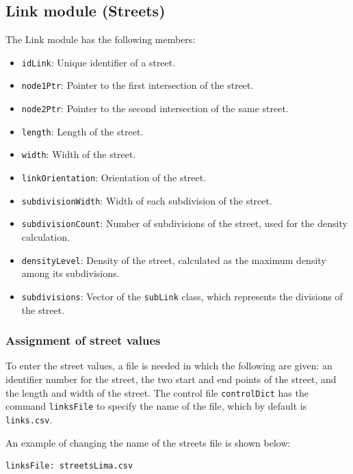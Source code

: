 \documentclass[12pt,a4paper]{book}
\begin{document}
\subsection{Link module (Streets)}
The Link module has the following members:
\begin{itemize}
  \item \texttt{idLink}: Unique identifier of a street.
  \item \texttt{node1Ptr}: Pointer to the first intersection of the street.
  \item \texttt{node2Ptr}: Pointer to the second intersection of the same street.
  \item \texttt{length}: Length of the street.
  \item \texttt{width}: Width of the street.
  \item \texttt{linkOrientation}: Orientation of the street.
  \item \texttt{subdivisionWidth}: Width of each subdivision of the street.
  \item \texttt{subdivisionCount}: Number of subdivisions of the street, used for the density
    calculation.
  \item \texttt{densityLevel}: Density of the street, calculated as the maximum density among its
    subdivisions.
  \item \texttt{subdivisions}: Vector of the \texttt{subLink} class, which represents the divisions
    of the street.
\end{itemize}

\subsubsection*{Assignment of street values}
To enter the street values, a file is needed in which the following are given: an identifier number
for the street, the two start and end points of the street, and the length and width of the street.
The control file \texttt{controlDict} has the command \texttt{linksFile} to specify the name of the
file, which by default is \texttt{links.csv}.

An example of changing the name of the streets file is shown below:
\begin{lstlisting}[style=control]
linksFile: streetsLima.csv
\end{lstlisting}
\end{document}
